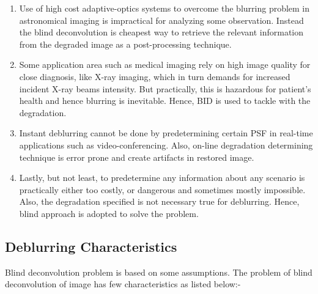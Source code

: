 \documentclass{article}
\begin{document}
\begin{enumerate}
    \item Use of high cost adaptive-optics systems to overcome the blurring problem in astronomical imaging is impractical for analyzing some observation. Instead the blind deconvolution is cheapest way to retrieve the relevant information from the degraded image as a post-processing technique. 
    
    \item Some application area such as medical imaging rely on high image quality for close diagnosis, like X-ray imaging, which in turn demands for increased incident X-ray beams intensity. But practically, this is hazardous for patient's health and hence blurring is inevitable. Hence, BID is used to tackle with the degradation.
    
    \item Instant deblurring cannot be done by predetermining certain PSF in real-time applications such as video-conferencing. Also, on-line degradation determining technique is error prone and create artifacts in restored image.
    
    \item Lastly, but not least, to predetermine any information about any scenario is practically either too costly, or dangerous and sometimes mostly impossible. Also, the degradation specified is not necessary true for deblurring. Hence, blind approach is adopted to solve the problem. 
\end{enumerate}


\subsection{Deblurring Characteristics}
Blind deconvolution problem is based on some assumptions. The problem of blind deconvolution of image has few characteristics as listed below:- 
\end{document}
